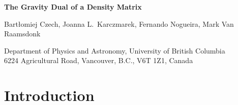 \documentclass[12pt]{article}
\renewcommand{\(}{\left(}
\renewcommand{\)}{\right)}
\begin{document}
\begin{titlepage}
\hfill
\vbox{
    \halign{#\hfil         \cr
           } %
      }  %
\vspace*{20mm}
\begin{center}
{\Large \bf The Gravity Dual of a Density Matrix}

\vspace*{15mm}
\vspace*{1mm}
Bart{\l}omiej Czech, Joanna L.~Karczmarek, Fernando Nogueira, Mark Van Raamsdonk
\vspace*{1cm}

{
Department of Physics and Astronomy,
University of British Columbia\\
6224 Agricultural Road,
Vancouver, B.C., V6T 1Z1, Canada}

\vspace*{1cm}
\end{center}

\begin{abstract}
For a state in a quantum field theory on some spacetime, we can associate a density matrix to any subset of a given spacelike slice by tracing out the remaining degrees of freedom. In the context of the AdS/CFT correspondence, if the original state has a dual bulk spacetime with a good classical description, it is natural to ask how much information about the bulk spacetime is carried by the density matrix for such a subset of field theory degrees of freedom. In this note, we provide several constraints on the largest region that can be fully reconstructed, and discuss specific proposals for the geometric construction of this dual region.

\end{abstract}

\end{titlepage}

\vskip 1cm

\section{Introduction}
\end{document}
